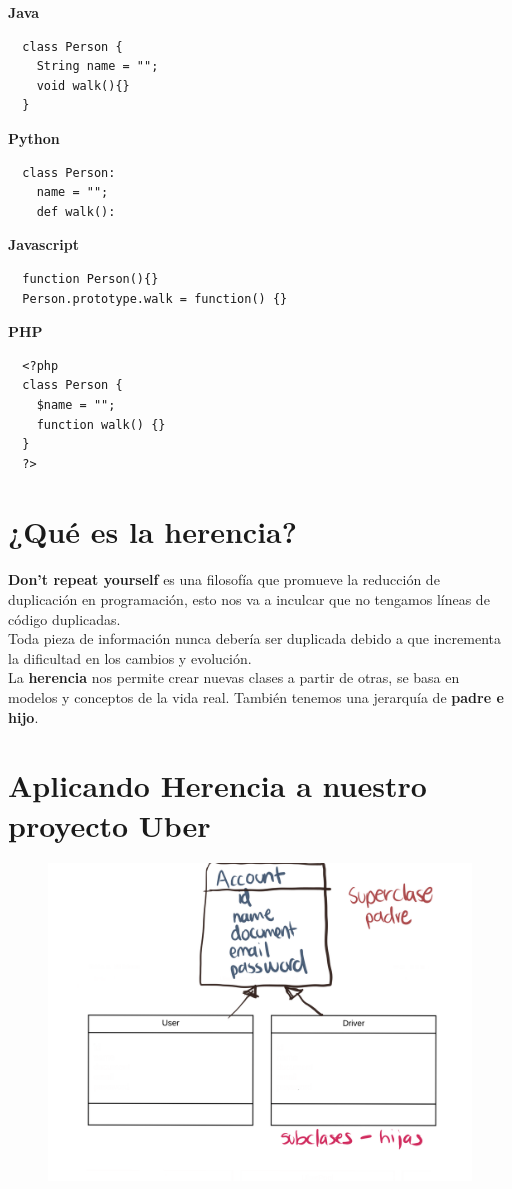 \documentclass{article}
\begin{document}
\textbf{Java}
\begin{verbatim}
  class Person {
    String name = "";
    void walk(){}
  }
\end{verbatim}

\textbf{Python}
\begin{verbatim}
  class Person:
    name = "";
    def walk():
\end{verbatim}

\textbf{Javascript}
\begin{verbatim}
  function Person(){}
  Person.prototype.walk = function() {}
\end{verbatim}

\textbf{PHP}
\begin{verbatim}
  <?php
  class Person {
    $name = "";
    function walk() {}
  }
  ?>
\end{verbatim}

\section{¿Qué es la herencia?}%
\textbf{Don't repeat yourself} es una filosofía que promueve la reducción de
duplicación en programación, esto nos va a inculcar que no tengamos líneas de
código duplicadas.\\

Toda pieza de información nunca debería ser duplicada debido a que incrementa
la dificultad en los cambios y evolución.\\

La \textbf{herencia} nos permite crear nuevas clases a partir de otras, se basa
en modelos y conceptos de la vida real. También tenemos una jerarquía de
\textbf{padre e hijo}.

\newpage
\section{Aplicando Herencia a nuestro proyecto Uber}%

\begin{figure}[h!]
  \centering
  \includegraphics[scale=0.08]{./Pictures/014_herencia_proyecto_uber2.png}
\end{figure}
\end{document}
